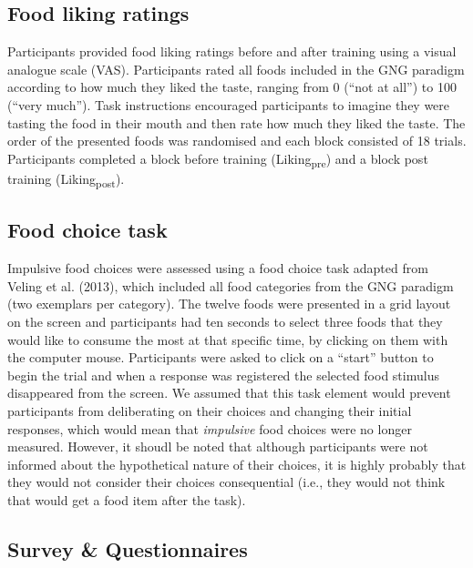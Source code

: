 \documentclass[man,floatsintext]{apa6}
\begin{document}
\hypertarget{food-liking-ratings}{%
\subsection{Food liking ratings}\label{food-liking-ratings}}

\par

Participants provided food liking ratings before and after training using a visual analogue scale (VAS). Participants rated all foods included in the GNG paradigm according to how much they liked the taste, ranging from 0 (\enquote{not at all}) to 100 (\enquote{very much}). Task instructions encouraged participants to imagine they were tasting the food in their mouth and then rate how much they liked the taste. The order of the presented foods was randomised and each block consisted of 18 trials. Participants completed a block before training (Liking\textsubscript{pre}) and a block post training (Liking\textsubscript{post}).

\hypertarget{food-choice-task}{%
\subsection{Food choice task}\label{food-choice-task}}

Impulsive food choices were assessed using a food choice task adapted from Veling et al. (2013), which included all food categories from the GNG paradigm (two exemplars per category). The twelve foods were presented in a grid layout on the screen and participants had ten seconds to select three foods that they would like to consume the most at that specific time, by clicking on them with the computer mouse. Participants were asked to click on a \enquote{start} button to begin the trial and when a response was registered the selected food stimulus disappeared from the screen. We assumed that this task element would prevent participants from deliberating on their choices and changing their initial responses, which would mean that \textit{impulsive} food choices were no longer measured. However, it shoudl be noted that although participants were not informed about the hypothetical nature of their choices, it is highly probably that they would not consider their choices consequential (i.e., they would not think that would get a food item after the task).

\hypertarget{survey-questionnaires}{%
\subsection{Survey \& Questionnaires}\label{survey-questionnaires}}
\end{document}
